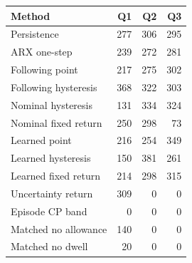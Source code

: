 \begin{tabular}{lrrr}\toprule
Method & Q1 & Q2 & Q3 \\\midrule
Persistence & 277 & 306 & 295 \\
ARX one-step & 239 & 272 & 281 \\
Following point & 217 & 275 & 302 \\
Following hysteresis & 368 & 322 & 303 \\
Nominal hysteresis & 131 & 334 & 324 \\
Nominal fixed return & 250 & 298 & 73 \\
Learned point & 216 & 254 & 349 \\
Learned hysteresis & 150 & 381 & 261 \\
Learned fixed return & 214 & 298 & 315 \\
Uncertainty return & 309 & 0 & 0 \\
Episode CP band & 0 & 0 & 0 \\
Matched no allowance & 140 & 0 & 0 \\
Matched no dwell & 20 & 0 & 0 \\
\bottomrule\end{tabular}

